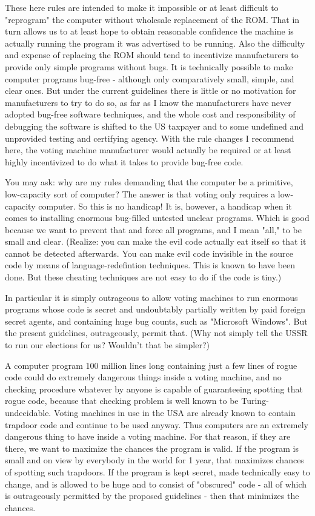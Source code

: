 These here rules are intended to make it impossible or at least
difficult to "reprogram" the computer without wholesale replacement of the ROM.
That in turn allows us to at least hope to obtain reasonable confidence the machine is 
actually running the program it was advertised to be running.  Also the difficulty and
expense of replacing the ROM should tend to incentivize manufacturers to provide
only simple programs without bugs.  
It is technically possible to make computer programs bug-free - although
only comparatively small, simple, and clear ones.
But under the current guidelines there is little or no motivation for
manufacturers to try to do so, as far as I know the manufacturers have never adopted
bug-free software techniques, and the whole cost and responsibility of
debugging the software is shifted to the US taxpayer and to some undefined and
unprovided testing and certifying agency.  With the rule changes I recommend here, the
voting machine manufacturer would actually be required or at least highly incentivized
to do what it takes to provide bug-free code.

You may ask: why are my rules demanding that the computer be a primitive, low-capacity
sort of computer?  The answer is that voting only requires a low-capacity computer.
So this is no handicap!  It is, however, a handicap when it comes to installing enormous
bug-filled untested unclear programs.  Which is good because we want to prevent that
and force all programs, and I mean "all," to be small and clear.
(Realize: you can make the evil code actually eat itself
so that it cannot be detected afterwards.  You can make evil code invisible in the source code
by means of language-redefintion techniques.  This is known to have been done.  But these
cheating techniques are not easy to do if the code is tiny.)

In particular it is simply outrageous to allow voting machines to run
enormous programs whose code is secret and undoubtably partially written by paid foreign
secret agents, and containing huge bug counts, such as "Microsoft Windows".  But the
present guidelines, outrageously, permit that.  (Why not simply tell the
USSR to run our elections for us?  Wouldn't that be simpler?)

A computer program 100 million lines long containing just a few lines of
rogue code could do extremely dangerous things inside a voting machine, and no
checking procedure whatever by anyone is capable of guaranteeing spotting that
rogue code, because that checking problem is well known to be Turing-undecidable.  
Voting machines in use in the USA are already known to contain trapdoor code and
continue to be used anyway.   Thus computers are an extremely dangerous thing to
have inside a voting machine.  For that reason, if they are there, we want to 
maximize the chances the program is valid.
If the program is small and on view by everybody in the world for 1 year, 
that maximizes chances of spotting such trapdoors.  If the program is kept secret, made
technically easy to change, and is allowed to be huge and to consist of "obscured"
code - all of which is outrageously permitted by the proposed guidelines - then
that minimizes the chances.

